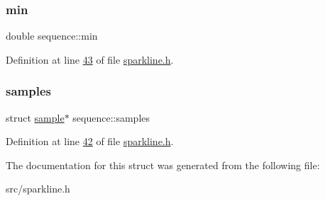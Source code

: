 \mbox{\label{structsequence_a2e31642f1ce5e5f9e5070204ee86b55a}} 
\subsubsection{\texorpdfstring{min}{min}}
{\footnotesize\ttfamily double sequence\+::min}



Definition at line \hyperlink{sparkline_8h_source_l00043}{43} of file \hyperlink{sparkline_8h_source}{sparkline.\+h}.

\mbox{\label{structsequence_a61d88e23d15a3da29992b8dcf91ac186}} 
\subsubsection{\texorpdfstring{samples}{samples}}
{\footnotesize\ttfamily struct \hyperlink{structsample}{sample}$\ast$ sequence\+::samples}



Definition at line \hyperlink{sparkline_8h_source_l00042}{42} of file \hyperlink{sparkline_8h_source}{sparkline.\+h}.



The documentation for this struct was generated from the following file\+:\begin{DoxyCompactItemize}
\item 
src/sparkline.\+h\end{DoxyCompactItemize}
